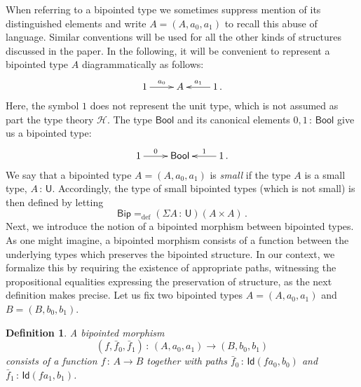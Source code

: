 \documentclass[10pt,a4paper,oneside,reqno]{amsart}
\numberwithin{equation}{section}
\theoremstyle{mythm}
\theoremstyle{mydef}
\newtheorem{definition}[theorem]{Definition}
\theoremstyle{myrmk}
\newcommand{\ie}{\text{i.e.\ }}
\newcommand{\defeq}{=_{\mathrm{def}}}
\newcommand{\co}{\,{:}\,}
\newcommand{\Hint}{\mathcal{H}}
\newcommand{\Bool}{\mathsf{Bool}}
\newcommand{\Id}{\mathsf{Id}}
\newcommand{\U}{\mathsf{U}}
\newcommand{\Bip}{\mathsf{Bip}}
\begin{document}
When referring to a bipointed type we sometimes suppress mention of its distinguished elements and write $A = (A, a_0, a_1)$ to recall this abuse of language. Similar conventions will be used for all the other kinds of structures discussed in the paper. In the following, it will be convenient to represent a bipointed type $A$  
diagrammatically as follows:
\[
\xymatrix{
1 \ar[r]^-{a_0}&  A & 1 \ar[l]_-{a_1} \, .}
 \]
Here, the symbol $1$ does not represent the unit type, which is not assumed as part the type theory $\Hint$.
The type $\Bool$ and its canonical elements $0, 1 \co \Bool$ give us a bipointed type:
\[
\xymatrix{
 1 \ar[r]^-{0}&  \Bool  & 1 \ar[l]_-{1} \, . }
 \]
We say that a bipointed type $A = (A, a_0, a_1)$ is \emph{small} if the type $A$ is a small type, \ie $A \co \U$. 
Accordingly, the type of small bipointed types (which is not small) is then defined by letting 
\[
\Bip \defeq (\Sigma A \co \U)( A \times A ) \, .
\]
Next, we introduce the notion of a bipointed morphism between bipointed types. 
As one might imagine, a bipointed morphism consists of a function between the underlying types which preserves
the bipointed structure. In our context, we formalize this by requiring the existence of appropriate paths, witnessing the propositional equalities expressing the preservation of structure, as the next definition makes precise. Let us fix two bipointed types $A = (A, a_0, a_1)$ and~$B = (B, b_0, b_1)$. 


\begin{definition} A \emph{bipointed morphism} 
\[
(f, \bar{f}_0, \bar{f}_1)  \co (A, a_0, a_1)  \to (B, b_0, b_1)
\] 
consists of a function $f \co A \to B$ together with paths $\bar{f}_0 \co  \Id(f a_0, b_0)$ 
and~$\bar{f}_1 \co \Id(f a_1, b_1)$.  
\end{definition}
\end{document}
